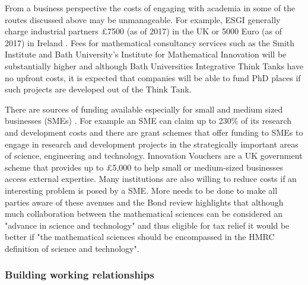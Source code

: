 \documentclass[11pt]{article} %
\begin{document}
	From a business perspective the costs of engaging with academia in some of the routes discussed above may be unmanageable. For example, ESGI generally charge industrial partners  £7500 (as of 2017) in the UK or 5000  Euro (as of 2017) in Ireland \cite{ESGIhandbook}. Fees for mathematical consultancy services such as the Smith Institute and Bath University's Institute for Mathematical Innovation will be substantially higher and although Bath Universities Integrative Think Tanks have no upfront costs, it is expected that companies will be able to fund PhD places if such projects are developed out of the Think Tank. 
	
	There are sources of funding available especially for small and medium sized businesses (SMEs) \cite{IMI}. For example an SME can claim up to 230\% of its research and development costs \cite{Gov}  and there are grant schemes that offer funding to SMEs to engage in research and development projects in the strategically important areas of science, engineering and technology. Innovation Vouchers are a UK government scheme that	provides up to £5,000 to help small or medium-sized
	businesses access external expertise. Many institutions are also willing to reduce costs if an interesting problem is posed by a SME. More needs to be done to make all parties aware of these avenues and the Bond review \cite{Bond} highlights that although much collaboration between the mathematical sciences can be considered an "advance in science and technology" and thus eligible for tax relief it would be better if "the mathematical sciences should be encompassed in the HMRC definition of science and technology".
	
	
	\subsubsection{Building working relationships}
	
\end{document}
